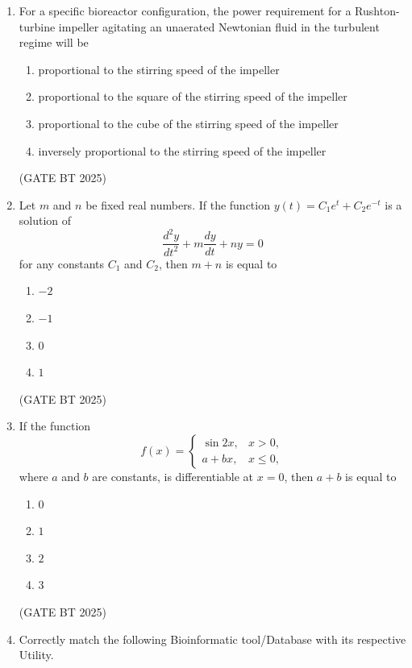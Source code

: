 \documentclass[journal,12pt,onecolumn]{IEEEtran}
\theoremstyle{remark}
\begin{document}
\begin{enumerate}
\item For a specific bioreactor configuration, the power requirement for a Rushton-turbine impeller agitating an unaerated Newtonian fluid in the turbulent regime will be

\begin{enumerate}
    \item proportional to the stirring speed of the impeller
    \item proportional to the square of the stirring speed of the impeller
    \item proportional to the cube of the stirring speed of the impeller
    \item inversely proportional to the stirring speed of the impeller
\end{enumerate}
\hfill (GATE BT 2025)

\item Let $m$ and $n$ be fixed real numbers. If the function $y(t) = C_1 e^t + C_2 e^{-t}$ is a solution of
\[
\frac{d^2 y}{dt^2} + m \frac{dy}{dt} + n y = 0
\]
for any constants $C_1$ and $C_2$, then $m + n$ is equal to

\begin{enumerate}
    \item $-2$
    \item $-1$
    \item $0$
    \item $1$
\end{enumerate}
\hfill (GATE BT 2025)

\item If the function
\[
f(x) = 
\begin{cases} 
\sin 2x, & x > 0, \\
a + b x, & x \le 0,
\end{cases}
\]
where $a$ and $b$ are constants, is differentiable at $x = 0$, then $a + b$ is equal to

\begin{enumerate}
    \item $0$
    \item $1$
    \item $2$
    \item $3$
\end{enumerate}
\hfill (GATE BT 2025)

\item Correctly match the following Bioinformatic tool/Database with its respective Utility.\\


\end{enumerate}
\end{document}
